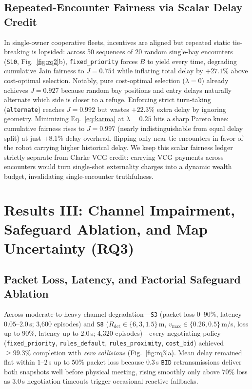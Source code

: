 \documentclass[letterpaper,journal]{IEEEtran}
\newcommand{\cb}{\texttt{cost\_bid}}
\begin{document}
\subsection{Repeated-Encounter Fairness via Scalar Delay Credit}
In single-owner cooperative fleets, incentives are aligned but repeated static tie-breaking is lopsided: across 50 sequences of 20 random single-bay encounters (\texttt{S10}, Fig.~\ref{fig:rq2}b), \texttt{fixed\_priority} forces $B$ to yield every time, degrading cumulative Jain fairness to $J=0.754$ while inflating total delay by $+27.1\%$ above cost-optimal selection. Notably, pure cost-optimal selection ($\lambda=0$) already achieves $J=0.927$ because random bay positions and entry delays naturally alternate which side is closer to a refuge. Enforcing strict turn-taking (\texttt{alternate}) reaches $J=0.992$ but wastes $+22.3\%$ extra delay by ignoring geometry. Minimizing Eq.~\eqref{eq:karma} at $\lambda=0.25$ hits a sharp Pareto knee: cumulative fairness rises to $J=0.997$ (nearly indistinguishable from equal delay split) at just $+8.1\%$ delay overhead, flipping only near-tie encounters in favor of the robot carrying higher historical delay. We keep this scalar fairness ledger strictly separate from Clarke VCG credit: carrying VCG payments across encounters would turn single-shot externality charges into a dynamic wealth budget, invalidating single-encounter truthfulness.

\section{Results III: Channel Impairment, Safeguard Ablation, and Map Uncertainty (RQ3)}\label{sec:rq3}

\subsection{Packet Loss, Latency, and Factorial Safeguard Ablation}
Across moderate-to-heavy channel degradation---\texttt{S3} (packet loss $0$--$90\%$, latency $0.05$--$2.0$\,s; 3,600 episodes) and \texttt{S8} ($R_{\mathrm{det}}\in\{6,3,1.5\}$\,m, $v_{\max}\in\{0.26,0.5\}$\,m/s, loss up to $90\%$, latency up to $2.0$\,s; 4,320 episodes)---every negotiating policy (\texttt{fixed\_priority}, \texttt{rules\_default}, \texttt{rules\_proximity}, \cb) achieved $\ge 99.3\%$ completion with \emph{zero collisions} (Fig.~\ref{fig:rq3}a). Mean delay remained flat within $1$--$2$\,s up to $50\%$ packet loss because $0.3$\,s \texttt{BID} retransmissions deliver both snapshots well before physical meeting, rising smoothly only above $70\%$ loss as $3.0$\,s negotiation timeouts trigger occasional reactive fallbacks.
\end{document}

